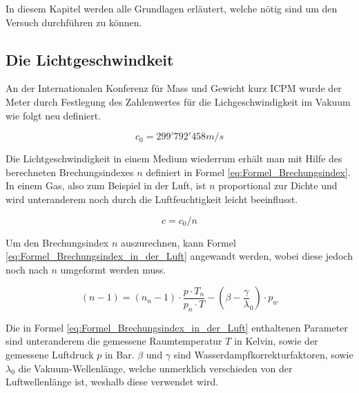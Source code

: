 In diesem Kapitel werden alle Grundlagen erläutert, welche nötig sind um den Versuch durchführen zu können. 

\subsection{Die Lichtgeschwindkeit}
\label{Die Lichtgeschwindkeit}

An der Internationalen Konferenz für Mass und Gewicht kurz ICPM wurde der Meter durch Festlegung des Zahlenwertes für die Lichgeschwindigkeit im Vakuum wie folgt neu definiert.

\begin{equation*}
c_{0} = 299'792'458 m/s
\label{eq:Lichtgeschwindigkeit}
\end{equation*}

Die Lichtgeschwindigkeit in einem Medium wiederrum erhält man mit Hilfe des berechneten Brechungsindexes $n$ definiert in Formel \ref{eq:Formel_Brechungsindex}. In einem Gas, also zum Beispiel in der Luft, ist $n$ proportional zur Dichte und wird unteranderem noch durch die Luftfeuchtigkeit leicht beeinflusst.

\begin{equation}
c=c_{0}/n
\label{eq:Formel_Brechungsindex}
\end{equation}

Um den Brechungsindex $n$ auszurechnen, kann Formel \ref{eq:Formel_Brechungsindex_in_der_Luft} angewandt werden, wobei diese jedoch noch nach $n$ umgeformt werden muss.

\begin{equation}
(n - 1) = (n_{n} - 1)\cdot\dfrac{p \cdot T_{n}}{p_{n} \cdot T}-(\beta - \dfrac{\gamma}{\lambda}_{0}) \cdot p_{w}
\label{eq:Formel_Brechungsindex_in_der_Luft}
\end{equation}

Die in Formel \ref{eq:Formel_Brechungsindex_in_der_Luft} enthaltenen Parameter sind unteranderem die gemessene Raumtemperatur $T$ in Kelvin, sowie der gemessene Luftdruck $p$ in Bar. $\beta$ und $\gamma$ sind Wasserdampfkorrekturfaktoren, sowie $\lambda_{0}$ die Vakuum-Wellenlänge, welche unmerklich verschieden von der Luftwellenlänge ist, weshalb diese verwendet wird.

